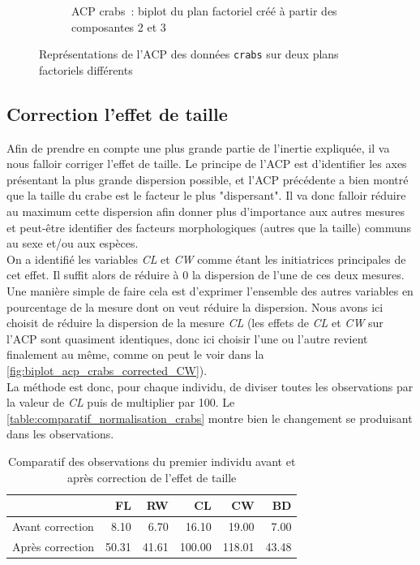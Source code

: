 \documentclass[a4paper,11pt]{report}
\begin{document}
\begin{figure}[H]
\begin{subfigure}[b]{0.5\linewidth}
		\caption{\scriptsize ACP crabs~: biplot du plan factoriel créé à partir des composantes 2 et 3}
		\label{fig:biplot_acp_crabs_plan_2_3}
	\end{subfigure}%
	\caption{
		\small Représentations de l'ACP des données \texttt{crabs} sur deux plans factoriels différents
	}
	\label{fig:biplots_crabs}%
\end{figure}



\subsection{Correction l'effet de taille}

Afin de prendre en compte une plus grande partie de l'inertie expliquée, il va nous falloir corriger l'effet de taille. Le principe de l'ACP est d'identifier les axes présentant la plus grande dispersion possible, et l'ACP précédente a bien montré que la taille du crabe est le facteur le plus "dispersant". Il va donc falloir réduire au maximum cette dispersion afin donner plus d'importance aux autres mesures et peut-être identifier des facteurs morphologiques (autres que la taille) communs au sexe et/ou aux espèces.\\
On a identifié les variables \textit{CL} et \textit{CW} comme étant les initiatrices principales de cet effet. Il suffit alors de réduire à 0 la dispersion de l'une de ces deux mesures. Une manière simple de faire cela est d'exprimer l'ensemble des autres variables en pourcentage de la mesure dont on veut réduire la dispersion. Nous avons ici choisit de réduire la dispersion de la mesure \textit{CL} (les effets de \textit{CL} et \textit{CW} sur l'ACP sont quasiment identiques, donc ici choisir l'une ou l'autre revient finalement au même, comme on peut le voir dans la \autoref{fig:biplot_acp_crabs_corrected_CW}).\\
La méthode est donc, pour chaque individu, de diviser toutes les observations par la valeur de \textit{CL} puis de multiplier par 100. Le \autoref{table:comparatif_normalisation_crabs} montre bien le changement se produisant dans les observations.

\begin{table}[H]
	\centering
	\captionsetup{justification=centering, margin=4cm}
	\caption{\scriptsize Comparatif des observations du premier individu avant et après correction de l'effet de taille}
	\label{table:comparatif_normalisation_crabs}
	\begin{tabular}{r|rrrrr}
		& FL & RW & CL & CW & BD \\ 
		\hline
		Avant correction & 8.10 & 6.70 & 16.10 & 19.00 & 7.00 \\ 
		Après correction & 50.31 & 41.61 & 100.00 & 118.01 & 43.48 \\ 
	\end{tabular}
\end{table}
\end{document}
